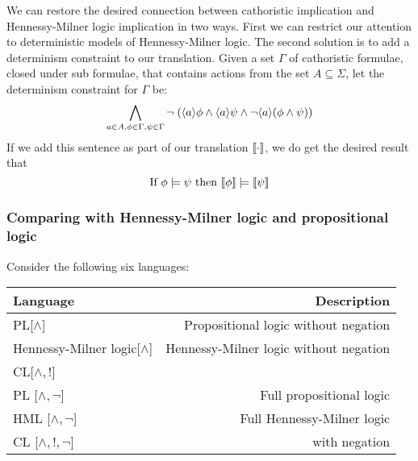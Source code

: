 We can restore the desired connection between cathoristic implication and
Hennessy-Milner logic implication in two ways. First we can restrict
our attention to deterministic models of Hennessy-Milner logic.  The
second solution is to add a determinism constraint to our
translation. Given a set $\Gamma$ of cathoristic formulae, closed under
sub formulae, that contains actions from the set $A \subseteq \Sigma$,
let the determinism constraint for $\Gamma$ be:
\[
\bigwedge_{a \in A, \phi \in \Gamma, \psi \in \Gamma} \neg \; (\langle a \rangle \phi \land \langle a \rangle \psi \land \neg \langle a \rangle (\phi \land \psi) )
\]
If we add this sentence as part of our translation $\lbrack\!\lbrack \cdot \rbrack\!\rbrack$, we
do get the desired result that
\[
\text{If } \phi \models \psi \text{ then } \lbrack\!\lbrack \phi \rbrack\!\rbrack \models \lbrack\!\lbrack \psi \rbrack\!\rbrack
\]


\subsubsection{Comparing \cathoristic{} with Hennessy-Milner logic and propositional logic}

Consider the following six languages:



\begin{center}
\begin{tabular}{ l | r }
Language & Description \\
\hline
PL[$\land$] & Propositional logic without negation \\
Hennessy-Milner logic[$\land$] & Hennessy-Milner logic without negation \\
CL[$\land, !$] & \Cathoristic{} \\
PL [$\land, \neg$] & Full propositional logic \\
HML [$\land, \neg$] & Full Hennessy-Milner logic \\
CL [$\land, !, \neg$] & \Cathoristic{} with negation\\
\end{tabular}
\end{center}



